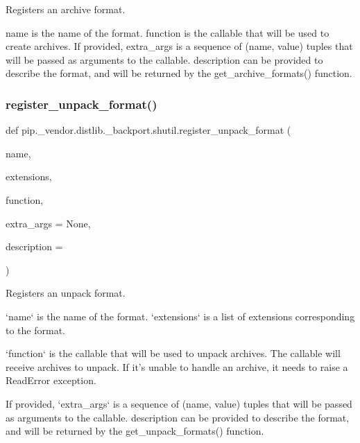 \begin{DoxyVerb}Registers an archive format.

name is the name of the format. function is the callable that will be
used to create archives. If provided, extra_args is a sequence of
(name, value) tuples that will be passed as arguments to the callable.
description can be provided to describe the format, and will be returned
by the get_archive_formats() function.
\end{DoxyVerb}
 \mbox{\label{namespacepip_1_1__vendor_1_1distlib_1_1__backport_1_1shutil_ada1fa01f86638140228be5fcc8d9ddd3}} 
\subsubsection{\texorpdfstring{register\+\_\+unpack\+\_\+format()}{register\_unpack\_format()}}
{\footnotesize\ttfamily def pip.\+\_\+vendor.\+distlib.\+\_\+backport.\+shutil.\+register\+\_\+unpack\+\_\+format (\begin{DoxyParamCaption}\item[{}]{name,  }\item[{}]{extensions,  }\item[{}]{function,  }\item[{}]{extra\+\_\+args = {\ttfamily None},  }\item[{}]{description = {\ttfamily \textquotesingle{}\textquotesingle{}} }\end{DoxyParamCaption})}

\begin{DoxyVerb}Registers an unpack format.

`name` is the name of the format. `extensions` is a list of extensions
corresponding to the format.

`function` is the callable that will be
used to unpack archives. The callable will receive archives to unpack.
If it's unable to handle an archive, it needs to raise a ReadError
exception.

If provided, `extra_args` is a sequence of
(name, value) tuples that will be passed as arguments to the callable.
description can be provided to describe the format, and will be returned
by the get_unpack_formats() function.
\end{DoxyVerb}
 \mbox{\label{namespacepip_1_1__vendor_1_1distlib_1_1__backport_1_1shutil_ad9316bb980d6a793b7310511c09d95d4}} 
